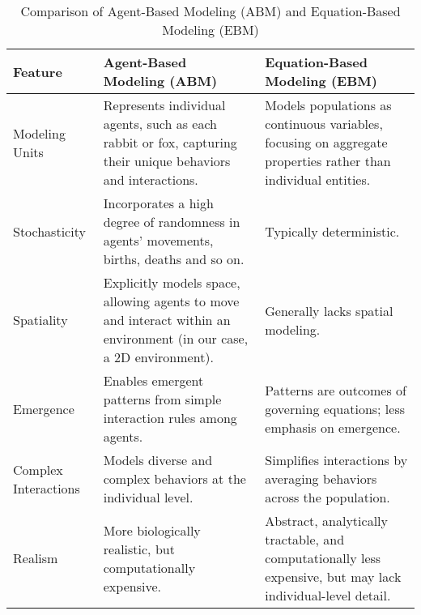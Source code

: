 \begin{table}[h]
\centering
{}
\caption{Comparison of Integration Methods}
\label{tab:integration_methods}
\end{table}


\begin{table}[h!]
    \centering
    \label{tab:diff_two_models_predator_prey}
    \begin{tabular}{|l|p{4.5cm}|p{4.5cm}|}
    \hline
    \textbf{Feature} & \textbf{Agent-Based Modeling (ABM)} & \textbf{Equation-Based Modeling (EBM)} \\
    \hline
    Modeling Units & Represents individual agents, such as each rabbit or fox, capturing their unique behaviors and interactions. & Models populations as continuous variables, focusing on aggregate properties rather than individual entities. \\
    \hline
    Stochasticity & Incorporates a high degree of randomness in agents' movements, births, deaths and so on. & Typically deterministic. \\
    \hline
    Spatiality & Explicitly models space, allowing agents to move and interact within an environment (in our case, a 2D environment). & Generally lacks spatial modeling. \\
    \hline
    Emergence & Enables emergent patterns from simple interaction rules among agents. & Patterns are outcomes of governing equations; less emphasis on emergence. \\
    \hline
    Complex Interactions & Models diverse and complex behaviors at the individual level. & Simplifies interactions by averaging behaviors across the population. \\
    \hline
    Realism & More biologically realistic, but computationally expensive. & Abstract, analytically tractable, and computationally less expensive, but may lack individual-level detail. \\
    \hline
    \end{tabular}
    \caption{Comparison of Agent-Based Modeling (ABM) and Equation-Based Modeling (EBM)}
\end{table}

